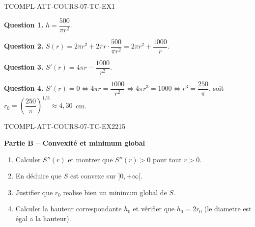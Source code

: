 \begin{corrige}{TCOMPL-ATT-COURS-07-TC-EX1}

\textbf{Question 1.} $h = \dfrac{500}{\pi r^2}$.

\textbf{Question 2.} $S(r) = 2\pi r^2 + 2\pi r \cdot \dfrac{500}{\pi r^2} = 2\pi r^2 + \dfrac{1000}{r}$.


\textbf{Question 3.} $S'(r) = 4\pi r - \dfrac{1000}{r^2}$.

\textbf{Question 4.} $S'(r) = 0 \iff 4\pi r = \dfrac{1000}{r^2} \iff 4\pi r^3 = 1000 \iff r^3 = \dfrac{250}{\pi}$, soit $r_0 = \left(\dfrac{250}{\pi}\right)^{1/3} \approx 4{,}30$~cm.

\end{corrige}

\bigskip


\begin{exercice}{TCOMPL-ATT-COURS-07-TC-EX2}{2}{15}

\textbf{Partie B -- Convexité et minimum global}

\begin{enumerate}
  \item Calculer $S''(r)$ et montrer que $S''(r) > 0$ pour tout $r > 0$.
  \item En déduire que $S$ est convexe sur $]0, +\infty[$.
  \item Justifier que $r_0$ realise bien un minimum global de $S$.
  \item Calculer la hauteur correspondante $h_0$ et vérifier que $h_0 = 2r_0$ (le diametre est égal a la hauteur).
\end{enumerate}

\end{exercice}

